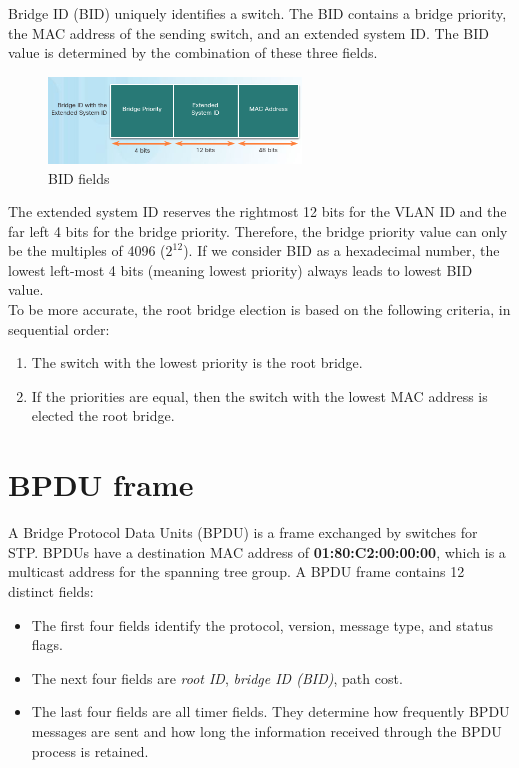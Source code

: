 Bridge ID (BID) uniquely identifies a switch. The BID contains a bridge priority, the MAC address of the sending switch, and an extended system ID. The BID value is determined by the combination of these three fields.\\

\begin{figure}[hbtp]
\centering
\includegraphics[width=0.6\textwidth]{pictures/BID.png}
\caption{BID fields}
\label{BID}
\end{figure}

The extended system ID reserves the rightmost 12 bits for the VLAN ID and the far left 4 bits for the bridge priority. Therefore, the bridge priority value can only be the multiples of 4096 ($2^{12}$). If we consider BID as a hexadecimal number, the lowest left-most 4 bits (meaning lowest priority) always leads to lowest BID value.\\

To be more accurate, the root bridge election is based on the following criteria, in sequential order:

\begin{enumerate}
\item The switch with the lowest priority is the root bridge.
\item If the priorities are equal, then the switch with the lowest MAC address is elected the root bridge.
\end{enumerate}

\section{BPDU frame}

A Bridge Protocol Data Units (BPDU) is a frame exchanged by switches for STP. BPDUs have a destination MAC address of \textbf{01:80:C2:00:00:00}, which is a multicast address for the spanning tree group. A BPDU frame contains 12 distinct fields:

\begin{itemize}
\item The first four fields identify the protocol, version, message type, and status flags.
\item The next four fields are \textit{root ID}, \textit{bridge ID (BID)}, path cost.
\item The last four fields are all timer fields. They determine how frequently BPDU messages are sent and how long the information received through the BPDU process is retained.
\end{itemize}


